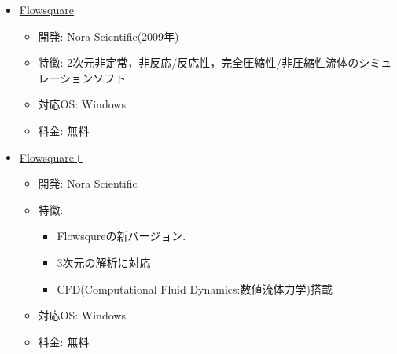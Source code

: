             
                \begin{itemize}
                \item \href{http://flowsquare.com/jp/}{Flowsquare}
                    \begin{itemize}
                    \item 開発: Nora Scientific(2009年)
                    \item 特徴: 2次元非定常，非反応/反応性，完全圧縮性/非圧縮性流体のシミュレーションソフト 
                    \item 対応OS: Windows
                    \item 料金: 無料
                    \end{itemize}
                    
                \item \href{https://fsp.norasci.com/}{Flowsquare+}
                    \begin{itemize}
                    \item 開発: Nora Scientific
                    \item 特徴:
                        \begin{itemize}
                        \item Flowsqureの新バージョン.
                        \item 3次元の解析に対応
                        \item CFD(Computational Fluid Dynamics:数値流体力学)搭載
                        \end{itemize}
                    \item 対応OS: Windows
                    \item 料金: 無料
                    \end{itemize}
                    

\end{itemize}
